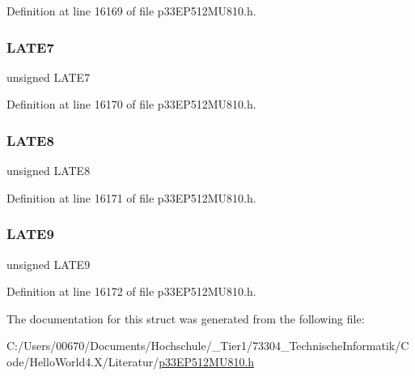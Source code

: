 Definition at line 16169 of file p33\+E\+P512\+M\+U810.\+h.

\mbox{\label{structtag_l_a_t_e_b_i_t_s_a4c9c6d0804a71546ff46c40bf7fa5e54}} 
\subsubsection{\texorpdfstring{L\+A\+T\+E7}{LATE7}}
{\footnotesize\ttfamily unsigned L\+A\+T\+E7}



Definition at line 16170 of file p33\+E\+P512\+M\+U810.\+h.

\mbox{\label{structtag_l_a_t_e_b_i_t_s_a676d0ef2b67084d4dc0d7b95a1421481}} 
\subsubsection{\texorpdfstring{L\+A\+T\+E8}{LATE8}}
{\footnotesize\ttfamily unsigned L\+A\+T\+E8}



Definition at line 16171 of file p33\+E\+P512\+M\+U810.\+h.

\mbox{\label{structtag_l_a_t_e_b_i_t_s_a1bd8054b3dba2bd2cea2de7e59e41d75}} 
\subsubsection{\texorpdfstring{L\+A\+T\+E9}{LATE9}}
{\footnotesize\ttfamily unsigned L\+A\+T\+E9}



Definition at line 16172 of file p33\+E\+P512\+M\+U810.\+h.



The documentation for this struct was generated from the following file\+:\begin{DoxyCompactItemize}
\item 
C\+:/\+Users/00670/\+Documents/\+Hochschule/\+\_\+\+Tier1/73304\+\_\+\+Technische\+Informatik/\+Code/\+Hello\+World4.\+X/\+Literatur/\hyperlink{p33_e_p512_m_u810_8h}{p33\+E\+P512\+M\+U810.\+h}\end{DoxyCompactItemize}

